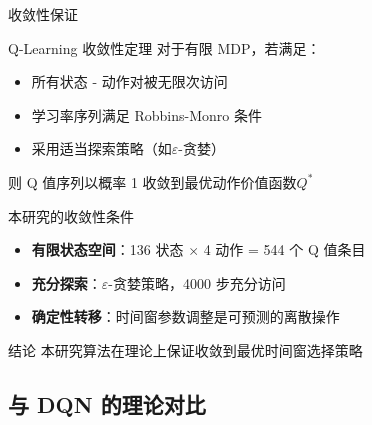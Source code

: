 {\begin{frame}{收敛性保证}
    \begin{block}{Q-Learning 收敛性定理}
        \footnotesize
        对于有限 MDP，若满足：
        \begin{itemize}
            \item 所有状态 - 动作对被无限次访问
            \item 学习率序列满足 Robbins-Monro 条件
            \item 采用适当探索策略（如$\varepsilon$-贪婪）
        \end{itemize}
        则 Q 值序列以概率 1 收敛到最优动作价值函数$Q^*$\cite{watkins1992q}
    \end{block}

    \begin{alertblock}{本研究的收敛性条件}
        \footnotesize
        \begin{itemize}
            \item \textbf{有限状态空间}：136 状态 $\times$ 4 动作 = 544 个 Q 值条目
            \item \textbf{充分探索}：$\varepsilon$-贪婪策略，4000 步充分访问
            \item \textbf{确定性转移}：时间窗参数调整是可预测的离散操作
        \end{itemize}
    \end{alertblock}

    \begin{exampleblock}{结论}
        \footnotesize
        本研究算法在理论上保证收敛到最优时间窗选择策略
    \end{exampleblock}
\end{frame}

\subsection{与 DQN 的理论对比}

}
